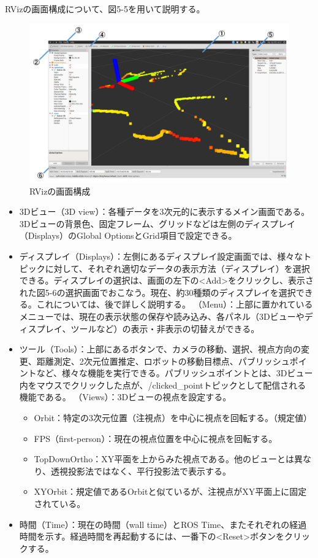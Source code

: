 RVizの画面構成について、図5-5を用いて説明する。

\begin{figure}[htp]
  \centering
  \includegraphics[width=\columnwidth]{pictures/chapter5/pic_05_05.png}
  \caption{RVizの画面構成}
\end{figure}

\begin{itemize}
\item 3Dビュー（3D view）：各種データを3次元的に表示するメイン画面である。3Dビューの背景色、固定フレーム、グリッドなどは左側のディスプレイ（Displays）のGlobal OptionsとGrid項目で設定できる。
\item ディスプレイ（Displays）：左側にあるディスプレイ設定画面では、様々なトピックに対して、それぞれ適切なデータの表示方法（ディスプレイ）を選択できる。ディスプレイの選択は、画面の左下の<Add>をクリックし、表示された図5-6の選択画面でおこなう。現在、約30種類のディスプレイを選択できる。これについては、後で詳しく説明する。
（Menu）：上部に置かれているメニューでは、現在の表示状態の保存や読み込み、各パネル（3Dビューやディスプレイ、ツールなど）の表示・非表示の切替えができる。
\item ツール（Tools）：上部にあるボタンで、カメラの移動、選択、視点方向の変更、距離測定、2次元位置推定、ロボットの移動目標点、パブリッシュポイントなど、様々な機能を実行できる。パブリッシュポイントとは、3Dビュー内をマウスでクリックした点が、/clicked\_pointトピックとして配信される機能である。
（Views）：3Dビューの視点を設定する。
  \begin{itemize}
  \item Orbit：特定の3次元位置（注視点）を中心に視点を回転する。（規定値）
  \item FPS（first-person）：現在の視点位置を中心に視点を回転する。
  \item TopDownOrtho：XY平面を上からみた視点である。他のビューとは異なり、透視投影法ではなく、平行投影法で表示する。
  \item  XYOrbit：規定値であるOrbitと似ているが、注視点がXY平面上に固定されている。
  \end{itemize}
\item 時間（Time）：現在の時間（wall time）とROS Time、またそれぞれの経過時間を示す。経過時間を再起動するには、一番下の<Reset>ボタンをクリックする。
\end{itemize}

